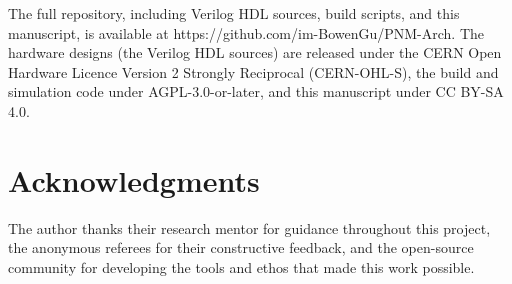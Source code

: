 \documentclass[10pt,twocolumn]{article}
\begin{document}
The full repository, including Verilog HDL sources, build scripts, and this manuscript, is available at https://github.com/im-BowenGu/PNM-Arch. The hardware designs (the Verilog HDL sources) are released under the CERN Open Hardware Licence Version 2 Strongly Reciprocal (CERN-OHL-S)\cite{20}, the build and simulation code under AGPL-3.0-or-later, and this manuscript under CC BY-SA 4.0.

\section*{Acknowledgments}\label{sec:acknowledgments}

The author thanks their research mentor for guidance throughout this project, the anonymous referees for their constructive feedback, and the open-source community for developing the tools and ethos that made this work possible.
\end{document}

